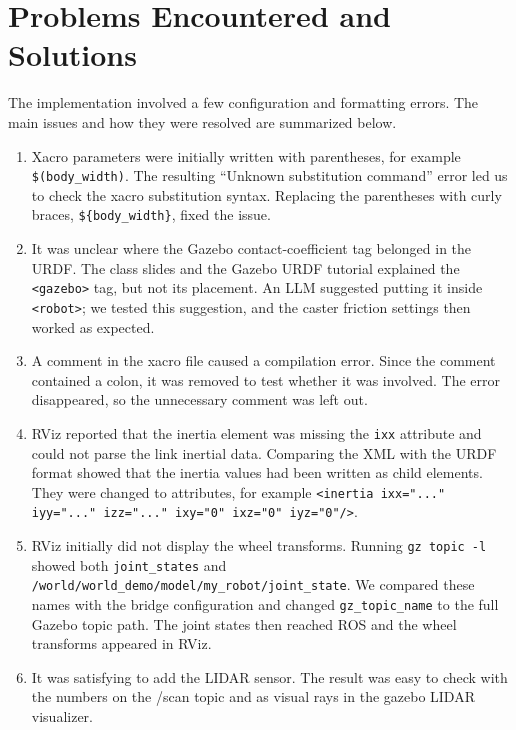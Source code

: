 \documentclass[10pt,a4paper]{article}
\begin{document}
\section{Problems Encountered and Solutions}

The implementation involved a few configuration and formatting errors.  The
main issues and how they were resolved are summarized below.

\begin{enumerate}
  \item Xacro parameters were initially written with parentheses, for example
  \texttt{\$(body\_width)}.  The resulting ``Unknown substitution command''
  error led us to check the xacro substitution syntax.  Replacing the
  parentheses with curly braces, \texttt{\$\{body\_width\}}, fixed the issue.

  \item It was unclear where the Gazebo contact-coefficient tag belonged in
  the URDF.  The class slides and the Gazebo URDF tutorial explained the
  \texttt{<gazebo>} tag, but not its placement.  An LLM suggested putting it
  inside \texttt{<robot>}; we tested this suggestion, and the caster friction
  settings then worked as expected.

  \item A comment in the xacro file caused a compilation error.  Since the
  comment contained a colon, it was removed to test whether it was involved.
  The error disappeared, so the unnecessary comment was left out.

  \item RViz reported that the inertia element was missing the \texttt{ixx}
  attribute and could not parse the link inertial data.  Comparing the XML with
  the URDF format showed that the inertia values had been written as child
  elements.  They were changed to attributes, for example
  \texttt{<inertia ixx="..." iyy="..." izz="..." ixy="0" ixz="0" iyz="0"/>}.

  \item RViz initially did not display the wheel transforms.  Running
  \texttt{gz topic -l} showed both \texttt{joint\_states} and
  \texttt{/world/world\_demo/model/my\_robot/joint\_state}.  We compared these
  names with the bridge configuration and changed \texttt{gz\_topic\_name} to
  the full Gazebo topic path.  The joint states then reached ROS and the wheel
  transforms appeared in RViz.

  \item It was satisfying to add the LIDAR sensor. The result was easy to
  check with the numbers on the /scan topic and as visual rays in the
  gazebo LIDAR visualizer.


\end{enumerate}
\end{document}
